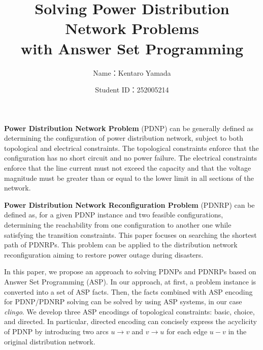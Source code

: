 \documentclass[dvipdfmx,a4paper]{jsarticle}
\title{Solving Power Distribution Network Problems \\ with Answer Set Programming}
\author{Name：Kentaro Yamada}
\date{Student ID：252005214}
\begin{document}
\maketitle

\textbf{Power Distribution Network Problem} (PDNP) can be generally 
defined as determining the configuration of power distribution network,
subject to both topological and electrical constraints. 
% 
The topological constraints enforce that the configuration has
no short circuit and no power failure.
%
The electrical constraints enforce that
the line current must not exceed the capacity
and that
the voltage magnitude must be
greater than or equal to the lower limit in all sections of the
network.

%

\textbf{Power Distribution Network Reconfiguration Problem} (PDNRP) can be
defined as, for a given PDNP instance and two feasible configurations,
determining the reachability from one configuration to another one
while satisfying the transition constraints.
This paper focuses on searching the shortest path of PDNRPs.
%
This problem can be applied to the distribution network
reconfiguration aiming to restore power outage during disasters.


In this paper, we propose an approach to solving PDNPs and PDNRPs
based on Answer Set Programming (ASP).
%
In our approach, at first, a problem instance is converted into 
a set of ASP facts. 
%
Then, the facts combined with ASP encoding
for PDNP/PDNRP solving can be solved by using ASP systems,
in our case \textit{clingo}.
%
We develop three ASP encodings of topological constraints:
\textsf{basic}, \textsf{choice}, and \textsf{directed}.
%
In particular, \textsf{directed} encoding can concisely express 
the acyclicity of PDNP by introducing
two arcs $u \rightarrow v$ and $v \rightarrow u$ 
for each edge $u-v$ in the original distribution network.
\end{document}
